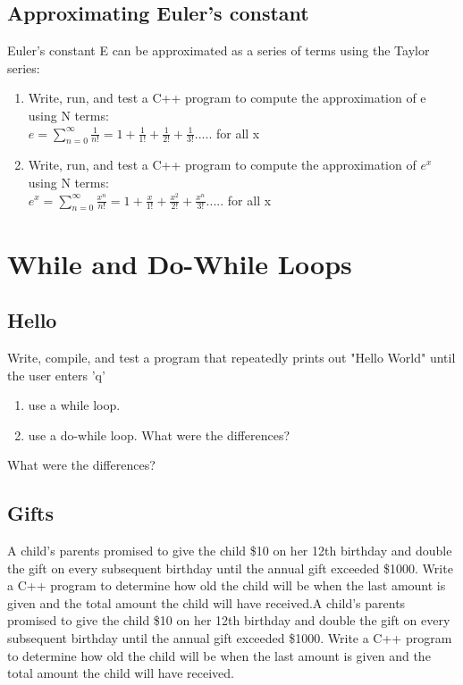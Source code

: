 \documentclass{article}
\begin{document}
\subsection{Approximating Euler's constant}
Euler's constant E can be approximated as a series of terms using the Taylor series:\\

\begin{enumerate}

\item Write, run, and test a C++ program to compute the approximation of e using N terms:\\
$e = \displaystyle \sum^{\infty  }_{n=0}\frac{1}{n!} = 1 + \frac{1}{1!} + \frac{1}{2!} + \frac{1}{3!} .....$ for all x
\item Write, run, and test a C++ program to compute the approximation of $e^{x}$ using N terms:\\
$e^{x}=\displaystyle \sum^{\infty}_{n=0}\frac{x^{n}}{n!} = 1 + \frac{x}{1!} + \frac{x^{2}}{2!} + \frac{x^{n}}{3!}.....$ for all x
\end{enumerate}

\section{While and Do-While Loops}

\subsection{Hello}
Write, compile, and test a program that repeatedly prints out "Hello World" until the user enters 'q'
\begin{enumerate}
	\item use a while loop.
	\item use a do-while loop. What were the differences?
\end{enumerate}
 What were the differences?

\subsection{Gifts}
A child’s parents promised to give the child \$10 on her 12th birthday and double the gift on every subsequent birthday until the annual gift exceeded \$1000. Write a C++ program to determine how old the child will be when the last amount is given and the total amount the child will have received.A child’s parents promised to give the child \$10 on her 12th birthday and double the gift on every subsequent birthday until the annual gift exceeded \$1000. Write a C++ program to determine how old the child will be when the last amount is given and the total amount the child will have received.
\end{document}
